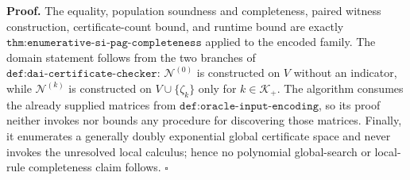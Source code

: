 \textbf{Proof.}
The equality, population soundness and completeness, paired witness construction, certificate-count bound, and runtime bound are exactly \(\texttt{thm:enumerative-si-pag-completeness}\) applied to the encoded family.  The domain statement follows from the two branches of \(\texttt{def:dai-certificate-checker}\): \(\mathcal N^{(0)}\) is constructed on \(V\) without an indicator, while \(\mathcal N^{(k)}\) is constructed on \(V\cup\{\zeta_k\}\) only for \(k\in\mathcal K_+\).  The algorithm consumes the already supplied matrices from \(\texttt{def:oracle-input-encoding}\), so its proof neither invokes nor bounds any procedure for discovering those matrices.  Finally, it enumerates a generally doubly exponential global certificate space and never invokes the unresolved local calculus; hence no polynomial global-search or local-rule completeness claim follows. \(\square\)